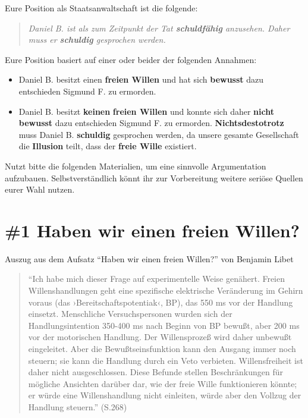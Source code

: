 \documentclass[
  a4paper,
]{report}
\begin{document}
Eure Position als Staatsanwaltschaft ist die folgende:

\begin{quote}
\emph{Daniel B. ist als zum Zeitpunkt der Tat \textbf{schuldfähig} anzusehen. Daher muss er \textbf{schuldig} gesprochen werden.}
\end{quote}

Eure Position basiert auf einer oder beider der folgenden Annahmen:

\begin{itemize}
\item
  Daniel B. besitzt einen \textbf{freien Willen} und hat sich \textbf{bewusst} dazu entschieden Sigmund F. zu ermorden.
\item
  Daniel B. besitzt \textbf{keinen} \textbf{freien Willen} und konnte sich daher \textbf{nicht} \textbf{bewusst} dazu entschieden Sigmund F. zu ermorden. \textbf{Nichtsdestotrotz} muss Daniel B. \textbf{schuldig} gesprochen werden, da unsere gesamte Gesellschaft die \textbf{Illusion} teilt, dass der \textbf{freie Wille} existiert.
\end{itemize}

Nutzt bitte die folgenden Materialien, um eine sinnvolle Argumentation aufzubauen. Selbstverständlich könnt ihr zur Vorbereitung weitere seriöse Quellen eurer Wahl nutzen.

\hypertarget{pr-ev1}{%
\section{\#1 Haben wir einen freien Willen?}\label{pr-ev1}}

Auszug aus dem Aufsatz ``Haben wir einen freien Willen?'' von Benjamin Libet \citeyearpar{Libet2004}

\begin{quote}
``Ich habe mich dieser Frage auf experimentelle Weise genähert. Freien Willenshandlungen geht eine spezifische elektrische Veränderung im Gehirn voraus (das ›Bereitschaftspotentiak‹, BP), das 550 ms vor der Handlung einsetzt. Menschliche Versuchspersonen wurden sich der Handlungsintention 350-400 ms nach Beginn von BP bewußt, aber 200 ms vor der motorischen Handlung. Der Willensprozeß wird daher unbewußt eingeleitet. Aber die Bewußtseinsfunktion kann den Ausgang immer noch steuern; sie kann die Handlung durch ein Veto verbieten. Willensfreiheit ist daher nicht ausgeschlossen. Diese Befunde stellen Beschränkungen für mögliche Ansichten darüber dar, wie der freie Wille funktionieren könnte; er würde eine Willenshandlung nicht einleiten, würde aber den Vollzug der Handlung steuern.'' (S.268)
\end{quote}
\end{document}
